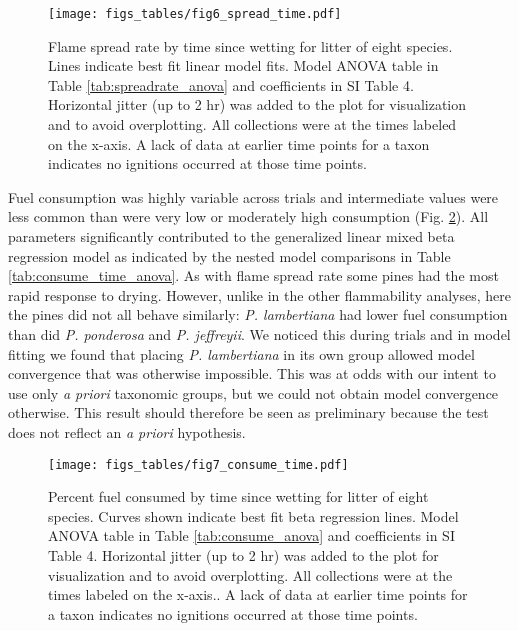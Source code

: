 \documentclass[fire,article,submit,moreauthors,pdftex]{Definitions/mdpi}
\begin{document}
\begin{figure}[H]
  \centering
\texttt{[image: figs\_tables/fig6\_spread\_time.pdf]}
\caption{Flame spread rate by time since wetting for litter of eight species.
  Lines indicate best fit linear model fits. Model ANOVA table in Table
  \ref{tab:spreadrate_anova} and coefficients in SI Table 4. Horizontal
  jitter (up to 2 hr) was added to the plot for visualization and to avoid
  overplotting. All collections were at the times labeled on the x-axis. A
  lack of data at earlier time points for a taxon indicates no ignitions
  occurred at those time points.}
\label{fig:spread_time}
\end{figure}



Fuel consumption was highly variable across trials and intermediate values were less common than were very low or moderately high consumption (Fig. \ref{fig:consume_time}). All parameters significantly contributed to the generalized linear mixed beta regression model as indicated by the nested model comparisons in Table \ref{tab:consume_time_anova}. As with flame spread rate some pines had the most rapid response to drying. However, unlike in the other flammability analyses, here the pines did not all behave similarly: \emph{P. lambertiana} had lower fuel consumption than did \emph{P. ponderosa} and \emph{P. jeffreyii}. We noticed this during trials and in model fitting we found that placing \emph{P. lambertiana} in its own group allowed model convergence that was otherwise impossible. This was at odds with our intent to use only \emph{a priori} taxonomic groups, but we could not obtain model convergence otherwise. This result should therefore be seen as preliminary because the test does not reflect an \emph{a priori} hypothesis.


\begin{figure}[H]
  \centering
\texttt{[image: figs\_tables/fig7\_consume\_time.pdf]}
\caption{Percent fuel consumed by time since wetting for litter of eight
  species. Curves shown indicate best fit beta regression lines. Model ANOVA
  table in Table \ref{tab:consume_anova} and coefficients in SI Table
  4. Horizontal jitter (up to 2 hr) was added to the plot for visualization and
  to avoid overplotting. All collections were at the times labeled on the
  x-axis.. A lack of data at earlier time points for a taxon indicates no
  ignitions occurred at those time points.}
  \label{fig:consume_time}
\end{figure}
\end{document}
